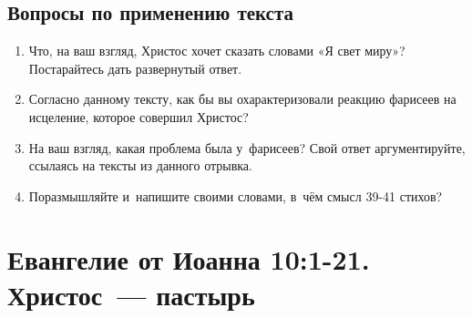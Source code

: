 \documentclass[a4paper,12pt]{article}
\begin{document}
\subsection*{Вопросы по применению текста} 
\begin{enumerate}
    \item Что, на ваш взгляд, Христос хочет сказать словами «Я свет миру»? Постарайтесь дать развернутый ответ.
    
    \myline
    
    \myline
    \item Согласно данному тексту, как бы вы охарактеризовали реакцию фарисеев на исцеление, которое совершил Христос? 
    
    \myline
    
    \myline
    \item На ваш взгляд, какая проблема была у~фарисеев? Свой ответ аргументируйте, ссылаясь на тексты из данного отрывка. 
    
    \myline
    
    \myline
    \item Поразмышляйте и~напишите своими словами, в~чём смысл 39-41 стихов?
    
    \myline
    
    \myline
\end{enumerate}


\section{Евангелие от Иоанна 10:1-21. Христос~--- пастырь}
\end{document}

